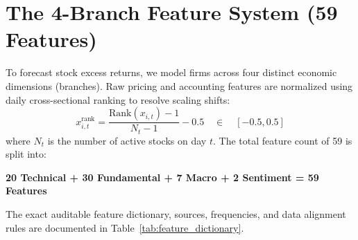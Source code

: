 \documentclass[11pt]{article}
\begin{document}
\section{The 4-Branch Feature System (59 Features)}
To forecast stock excess returns, we model firms across four distinct economic dimensions (branches). Raw pricing and accounting features are normalized using daily cross-sectional ranking to resolve scaling shifts:
\begin{equation}
    x_{i,t}^{\text{rank}} = \frac{\text{Rank}(x_{i,t}) - 1}{N_t - 1} - 0.5 \quad \in \quad [-0.5, 0.5]
\end{equation}
where $N_t$ is the number of active stocks on day $t$. The total feature count of 59 is split into:
\begin{center}
    \textbf{20 Technical + 30 Fundamental + 7 Macro + 2 Sentiment = 59 Features}
\end{center}

The exact auditable feature dictionary, sources, frequencies, and data alignment rules are documented in Table~\ref{tab:feature_dictionary}.
\end{document}
